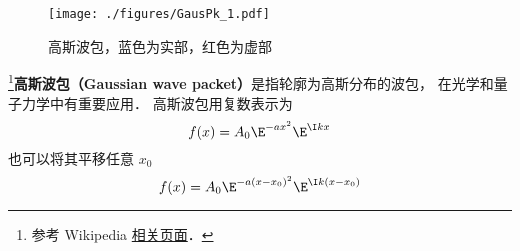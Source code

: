 
\begin{issues}
\issueDraft
\end{issues}


\begin{figure}[ht]
\centering
\texttt{[image: ./figures/GausPk\_1.pdf]}
\caption{高斯波包，蓝色为实部，红色为虚部} \label{GausPk_fig1}
\end{figure}

\footnote{参考 Wikipedia \href{https://en.wikipedia.org/wiki/Wave_packet}{相关页面}．}\textbf{高斯波包（Gaussian wave packet）}是指轮廓为高斯分布的波包， 在光学和量子力学中有重要应用． 高斯波包用复数表示为
\begin{equation}
f(x) = A_0 \E^{-a x^2}\E^{\I k x}
\end{equation}
也可以将其平移任意 $x_0$
\begin{equation}
f(x) = A_0 \E^{-a(x-x_0)^2}\E^{\I k (x-x_0)}
\end{equation}
